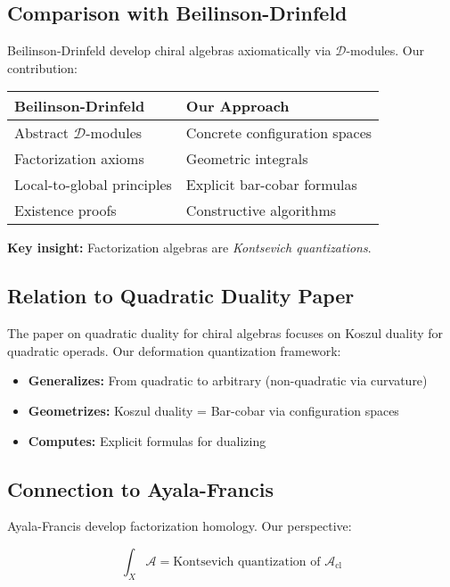 \subsection{Comparison with Beilinson-Drinfeld}

Beilinson-Drinfeld \cite{BD04} develop chiral algebras axiomatically via $\mathcal{D}$-modules. Our contribution:

\begin{center}
\begin{tabular}{|l|l|}
\hline
\textbf{Beilinson-Drinfeld} & \textbf{Our Approach} \\
\hline
Abstract $\mathcal{D}$-modules & Concrete configuration spaces \\
Factorization axioms & Geometric integrals \\
Local-to-global principles & Explicit bar-cobar formulas \\
Existence proofs & Constructive algorithms \\
\hline
\end{tabular}
\end{center}

\textbf{Key insight:} Factorization algebras are \emph{Kontsevich quantizations}.

\subsection{Relation to Quadratic Duality Paper}

The paper on quadratic duality for chiral algebras \cite{QuadDual} focuses on Koszul duality for quadratic operads. Our deformation quantization framework:

\begin{itemize}
\item \textbf{Generalizes:} From quadratic to arbitrary (non-quadratic via curvature)
\item \textbf{Geometrizes:} Koszul duality = Bar-cobar via configuration spaces
\item \textbf{Computes:} Explicit formulas for dualizing
\end{itemize}

\subsection{Connection to Ayala-Francis}

Ayala-Francis \cite{AF15} develop factorization homology. Our perspective:

$$\int_X \mathcal{A} = \text{Kontsevich quantization of } \mathcal{A}_{\text{cl}}$$

